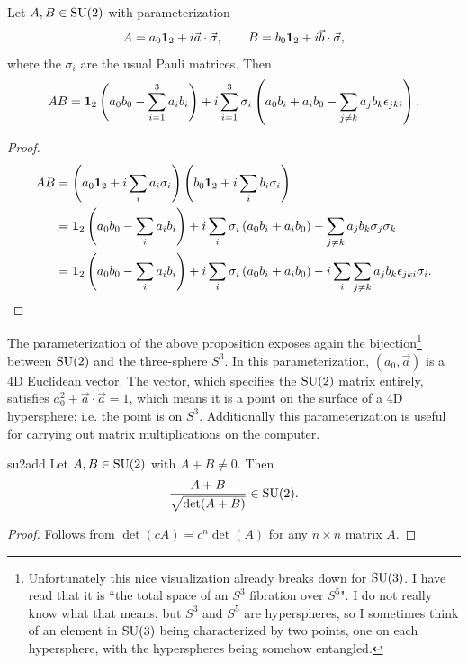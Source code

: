 \begin{proposition}{}{}
  Let $A,B\in\operatorname{SU}(2)$ with parameterization
  $$
    A=a_0{\mathbf 1}_2+i\vec{a}\cdot\vec{\sigma}, \qquad
    B=b_0{\mathbf 1}_2+i\vec{b}\cdot\vec{\sigma},
  $$
  where the $\sigma_i$ are the usual Pauli matrices. Then
  \begin{equation*}
    AB={\mathbf 1}_2\left(a_0b_0-\sum\limits_{i=1}^3a_ib_i\right)
        +i\sum\limits_{i=1}^3\sigma_i\left(a_0b_i+a_ib_0
          -\sum\limits_{j\neq k}a_jb_k\epsilon_{jki}\right).
  \end{equation*}
  \begin{proof}
    \begin{equation*}
      \begin{aligned}
        AB&=\left(a_0{\mathbf 1}_2+i\sum\limits_ia_i\sigma_i\right)
            \left(b_0{\mathbf 1}_2+i\sum\limits_ib_i\sigma_i\right)\\
          &={\mathbf 1}_2\left(a_0b_0-\sum\limits_ia_ib_i\right)
            +i\sum\limits_i\sigma_i\left(a_0b_i+a_ib_0\right)
            -\sum\limits_{j\neq k}a_jb_k\sigma_j\sigma_k \\
          &={\mathbf 1}_2\left(a_0b_0-\sum\limits_ia_ib_i\right)
            +i\sum\limits_i\sigma_i\left(a_0b_i+a_ib_0\right)
            -i\sum\limits_i
                \sum\limits_{j\neq k}a_jb_k\epsilon_{jki}\sigma_i.
      \end{aligned}
    \end{equation*}
  \end{proof}
\end{proposition}
The parameterization of the above proposition exposes again
the bijection\footnote{Unfortunately this nice visualization
already breaks down for $\operatorname{SU}(3)$. I have read that it is ``the total space of 
an $S^3$ fibration over $S^5$". I do not really know what that means, but $S^3$
and $S^5$ are hyperspheres, so I sometimes think of an element in $\operatorname{SU}(3)$ being
characterized by two points, one on each hypersphere, with the hyperspheres
being somehow entangled.} between $\operatorname{SU}(2)$ and the three-sphere $S^3$.
In this parameterization, $(a_0,\vec{a})$ is a 4D Euclidean vector.
The vector, which specifies the $\operatorname{SU}(2)$ matrix entirely,
satisfies $a_0^2+\vec{a}\cdot\vec{a}=1$, which means it is a point on the surface of a 4D
hypersphere; i.e. the point is on $S^3$.
Additionally this parameterization is useful for carrying out
matrix multiplications on the computer.

\begin{proposition}{}{su2add}
  Let $A,B\in\operatorname{SU}(2)$ with $A+B\neq0$. Then
  $$
  \frac{A+B}{\sqrt{\det(A+B)}}\in\operatorname{SU}(2).
  $$
  \begin{proof}
    Follows from $\det(cA)=c^n\det(A)$ for any $n\times n$ matrix $A$.
  \end{proof}
\end{proposition}

